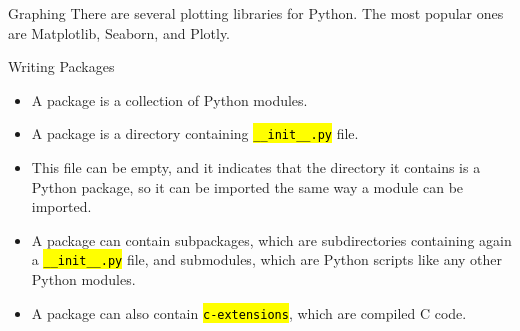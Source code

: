 \documentclass[
    aspectratio=169, 
    usepdftitle=false, 
    xcolor={dvipsnames},
    hyperref={
        colorlinks,
        linkcolor=black,
        urlcolor=blue}
    ]{beamer}
\let\OldTexttt\texttt
\renewcommand{\texttt}[1]{\OldTexttt{\hl{#1}}}%
\begin{document}
\begin{frame}{Graphing}
    There are several plotting libraries for Python. The most popular ones are Matplotlib, Seaborn, and Plotly.
\end{frame}

\begin{frame}[fragile]{Writing Packages}
    \begin{itemize}
        \item A package is a collection of Python modules.
        \item A package is a directory containing \texttt{\_\_init\_\_.py} file.
        \item This file can be empty, and it indicates that the directory it contains is a Python package, so it can be imported the same way a module can be imported.
        \item A package can contain subpackages, which are subdirectories containing again a \texttt{\_\_init\_\_.py} file, and submodules, which are Python scripts like any other Python modules.
        \item A package can also contain \texttt{c-extensions}, which are compiled C code.
    \end{itemize}
\end{frame}
\end{document}
